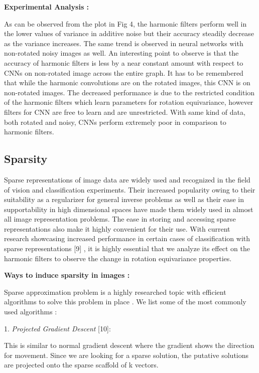 \documentclass{article}
\begin{document}
\textbf{Experimental Analysis :}

As can be observed from the plot in Fig 4, the harmonic filters perform well in the lower values of variance in additive noise but their accuracy steadily decrease as the variance increases. The same trend is observed in neural networks with non-rotated noisy images as well. An interesting point to observe is that the accuracy of harmonic filters is less by a near constant amount with respect to CNNs on non-rotated image across the entire graph. It has to be remembered that while the harmonic convolutions are on the rotated images, this CNN is on non-rotated images. The decreased performance is due to the restricted condition of the harmonic filters which learn parameters for rotation equivariance, however filters for CNN are free to learn and are unrestricted.
With same kind of data, both rotated and noisy, CNNs perform extremely poor in comparison to harmonic filters.

\subsection{Sparsity}

Sparse representations of image data are widely used and recognized in the field of vision and classification experiments. Their increased popularity owing to their suitability as a regularizer for general inverse problems as well as their ease in supportability in high dimensional spaces have made them widely used in almost all image representation problems. The ease in storing and accessing sparse representations also make it highly convenient for their use. With current research showcasing increased performance in certain cases of classification with sparse representations [9] , it is highly essential that we analyze its effect on the harmonic filters to observe the change in rotation equivariance properties.

\textbf{Ways to induce sparsity in images :}

Sparse approximation problem is a highly researched topic with efficient algorithms to solve this problem in place . We list some of the most commonly used algorithms :

1.	\emph{Projected Gradient Descent} [10]: 

This is similar to normal gradient descent where the gradient shows the direction for movement. Since we are looking for a sparse solution, the putative solutions are projected onto the sparse scaffold of k vectors.
\end{document}
